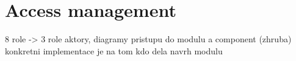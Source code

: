 \chapter{Access management}
8 role -> 3 role
aktory, diagramy pristupu do modulu a component (zhruba) konkretni implementace je na tom kdo dela navrh modulu
